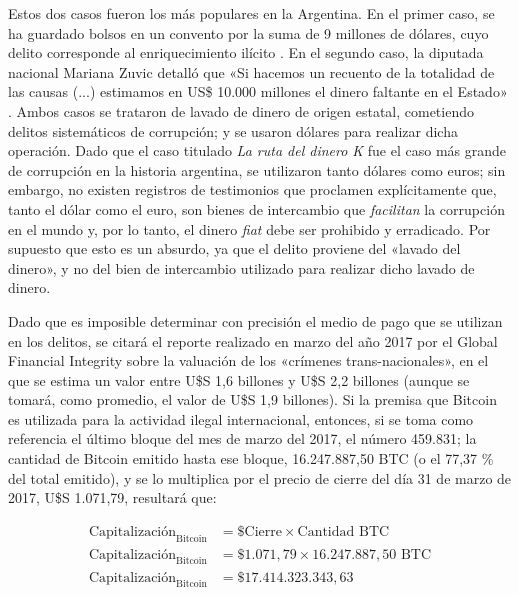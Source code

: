 \documentclass[12pt,a4paper,twoside]{book}
\begin{document}
Estos dos casos fueron los más populares en la Argentina. En el primer caso, se ha guardado bolsos en un convento por la suma de 9 millones de dólares, cuyo delito corresponde al enriquecimiento ilícito \cite{bolso-juliolopez2}. En el segundo caso, la diputada nacional Mariana Zuvic detalló que «Si hacemos un recuento de la totalidad de las causas (...) estimamos en US\$ 10.000 millones el dinero faltante en el Estado» \cite{bolso-farina2}. Ambos casos se trataron de lavado de dinero de origen estatal, cometiendo delitos sistemáticos de corrupción; y se usaron dólares para realizar dicha operación. Dado que el caso titulado \textit{La ruta del dinero K} fue el caso más grande de corrupción en la historia argentina, se utilizaron tanto dólares como euros; sin embargo, no existen registros de testimonios que proclamen explícitamente que, tanto el dólar como el euro, son bienes de intercambio que \textit{facilitan} la corrupción en el mundo y, por lo tanto, el dinero \textit{fiat} debe ser prohibido y erradicado. Por supuesto que esto es un absurdo, ya que el delito proviene del «lavado del dinero», y no del bien de intercambio utilizado para realizar dicho lavado de dinero.

Dado que es imposible determinar con precisión el medio de pago que se utilizan en los delitos, se citará el reporte realizado en marzo del año 2017 por el Global Financial Integrity sobre la valuación de los «crímenes trans-nacionales», en el que se estima un valor entre U\$S 1,6 billones y U\$S 2,2 billones \cite[pág. 99]{crimenes-internacionales} (aunque se tomará, como promedio, el valor de U\$S 1,9 billones). Si la premisa que Bitcoin es utilizada para la actividad ilegal internacional, entonces, si se toma como referencia el último bloque del mes de marzo del 2017, el número 459.831; la cantidad de Bitcoin emitido hasta ese bloque, 16.247.887,50 BTC (o el 77,37 \% del total emitido), y se lo multiplica por el precio de cierre del día 31 de marzo de 2017, U\$S 1.071,79, resultará que:

\begin{align*}
\text{Capitalización}_{\text{Bitcoin}} &= \text{\$ Cierre} \times \text{Cantidad BTC} \\
\text{Capitalización}_{\text{Bitcoin}} &= \text{\$ } 1.071,79 \times 16.247.887,50 \text{ BTC}\\
\text{Capitalización}_{\text{Bitcoin}} &= \text{\$ } 17.414.323.343,63 \\
\end{align*}
\end{document}

